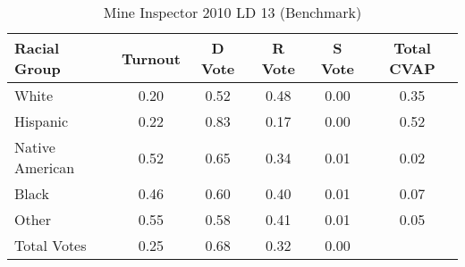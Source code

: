 \begin{table}[htb]
\begin{center}
\caption{Mine Inspector 2010 LD 13 (Benchmark)}
\label{smine_cvap_ld_13_benchmark}
\begin{tabular}{lccccc}
  \hline
Racial Group & Turnout & D Vote & R Vote & S Vote & Total CVAP \\ 
  \hline
White & 0.20 & 0.52 & 0.48 & 0.00 & 0.35 \\ 
  Hispanic & 0.22 & 0.83 & 0.17 & 0.00 & 0.52 \\ 
  Native American & 0.52 & 0.65 & 0.34 & 0.01 & 0.02 \\ 
  Black & 0.46 & 0.60 & 0.40 & 0.01 & 0.07 \\ 
  Other & 0.55 & 0.58 & 0.41 & 0.01 & 0.05 \\ 
  Total Votes & 0.25 & 0.68 & 0.32 & 0.00 &  \\ 
   \hline
\end{tabular}
\end{center}
\end{table}
